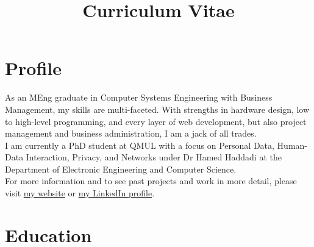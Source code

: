 \documentclass[10pt,a4paper,sans]{moderncv} %
\title{Curriculum Vitae}
\begin{document}
\makecvtitle

\section{Profile}

\hspace*{15pt}
As an MEng graduate in Computer Systems Engineering with Business Management, my skills are multi-faceted. With strengths in hardware design, low to high-level programming, and every layer of web development, but also project management and business administration, I am a jack of all trades.
\\[5pt]
\hspace*{15pt}
I am currently a PhD student at QMUL with a focus on Personal Data, Human-Data Interaction, Privacy, and Networks under Dr Hamed Haddadi at the Department of Electronic Engineering and Computer Science.
\\[5pt]
\hspace*{15pt}
For more information and to see past projects and work in more detail, please visit \href{http://yousefamar.com}{my website} or \href{http://linkedin.com/in/yousefamar}{my LinkedIn profile}.


\vspace*{8pt}
\section{Education}
\end{document}
